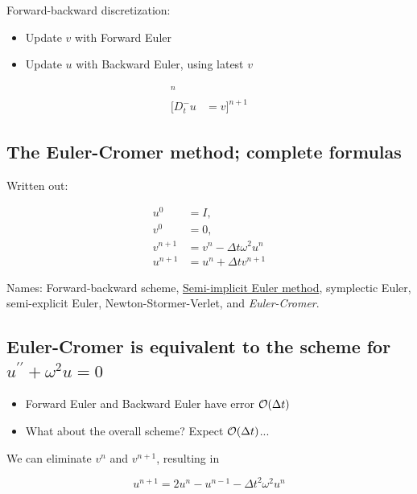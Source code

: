 \documentclass[%
oneside,                 %
final,                   %
10pt]{article}
\begin{document}
Forward-backward discretization:

\begin{itemize}
  \item Update $v$ with Forward Euler

  \item Update $u$ with Backward Euler, using latest $v$
\end{itemize}

\noindent
\begin{align}
[D_t^+v &= -\omega^2u]^n\\ 
[D_t^-u &= v]^{n+1}
\end{align}

\subsection*{The Euler-Cromer method; complete formulas}

Written out:

\begin{align}
u^0 &= I,\\ 
v^0 &= 0,\\ 
v^{n+1} &= v^n -\Delta t \omega^2u^{n}
\label{vib:model2x2:EulerCromer:veq1}\\ 
u^{n+1} &= u^n + \Delta t v^{n+1}
\label{vib:model2x2:EulerCromer:ueq1}
\end{align}

Names: Forward-backward scheme, \href{{http://en.wikipedia.org/wiki/Semi-implicit_Euler_method}}{Semi-implicit Euler method}, symplectic
Euler, semi-explicit Euler, Newton-Stormer-Verlet, and \emph{Euler-Cromer}.

\subsection*{Euler-Cromer is equivalent to the scheme for $u^{\prime\prime}+\omega^2u=0$}

\begin{itemize}
 \item Forward Euler and Backward Euler have error $\Oof{\Delta t}$

 \item What about the overall scheme? Expect $\Oof{\Delta t}$...
\end{itemize}

\noindent
We can eliminate $v^n$ and $v^{n+1}$, resulting in

\[
u^{n+1} = 2u^n - u^{n-1} - \Delta t^2 \omega^2u^{n}
\]
\end{document}
